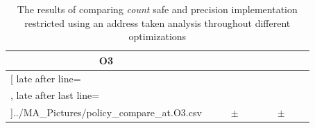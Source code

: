 \begin{table}[!htbp]
{\begin{tabular}{l|c|rcl|c|rcl|c}
\multicolumn{1}{c}{\bfseries O3}
	\\\midrule
	\csvreader[ late after line=\\, late after last line=\\\bottomrule]{../MA_Pictures/policy_compare_at.O3.csv}{
}
	{\csvcolii  &  \csvcoliii & \csvcoliv & $\pm$ & \csvcolv & \csvcolvi & \csvcolvii & $\pm$ & \csvcolviii& \csvcolix}%

    	\end{tabular}
}
		\caption {The results of comparing \textit{count} safe and precision implementation restricted using an address taken analysis throughout different optimizations}
		\label{tbl:policycompatcount}
\end{table}

